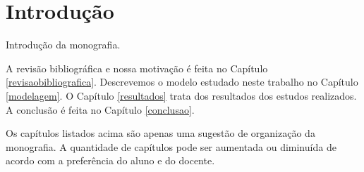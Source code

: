\chapter{Introdução}\label{introducao}

Introdução da monografia.

A revisão bibliográfica e nossa motivação é feita no Capítulo \ref{revisaobibliografica}. Descrevemos o modelo estudado neste trabalho no Capítulo \ref{modelagem}. O Capítulo \ref{resultados} trata dos resultados dos estudos realizados. A conclusão é feita no Capítulo \ref{conclusao}.

Os capítulos listados acima são apenas uma sugestão de organização da monografia. A quantidade de capítulos pode ser aumentada ou diminuída de acordo com a preferência do aluno e do docente.
